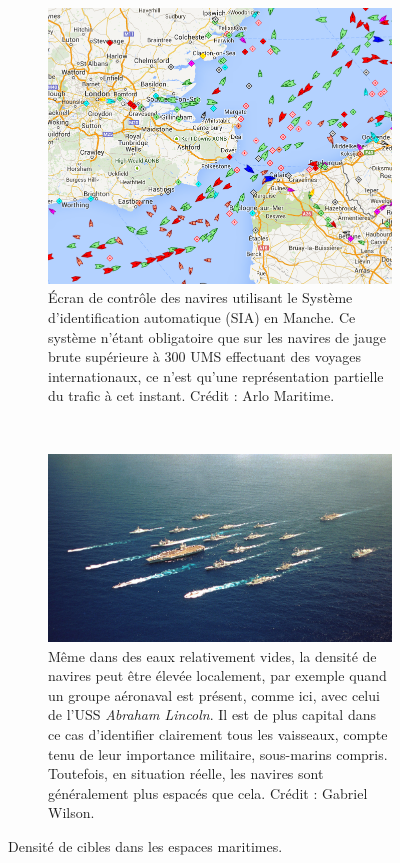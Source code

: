 	\begin{figure}[!htbp]
		\begin{subfigure}[t]{0.40\textwidth}
			\centering
			\includegraphics[width=\textwidth]{figures/ch1/channel}
			\caption[Écran de contrôle maritime en Manche (SIA)]{Écran de contrôle des navires utilisant le Système d'identification automatique (SIA) en Manche. Ce système n'étant obligatoire que sur les navires de jauge brute supérieure à 300 UMS effectuant des voyages internationaux, ce n'est qu'une représentation partielle du trafic à cet instant. Crédit : Arlo Maritime.}
			\label{fig:channel}
		\end{subfigure}
		~
		\begin{subfigure}[t]{0.58\textwidth}
			\centering
			\includegraphics[width=\textwidth]{figures/ch1/lincoln}
			\caption[Le groupe aéronaval de l'USS \emph{Abraham Lincoln}]{Même dans des eaux relativement vides, la densité de navires peut être élevée localement, par exemple quand un groupe aéronaval est présent, comme ici, avec celui de l'USS \emph{Abraham Lincoln}. Il est de plus capital dans ce cas d'identifier clairement tous les vaisseaux, compte tenu de leur importance militaire, sous-marins compris. Toutefois, en situation réelle, les navires sont généralement plus espacés que cela. Crédit : Gabriel Wilson.}
			\label{fig:lincoln}
		\end{subfigure}
		\label{fig:muddyWaters}
		\caption{Densité de cibles dans les espaces maritimes.}
	\end{figure}
	
